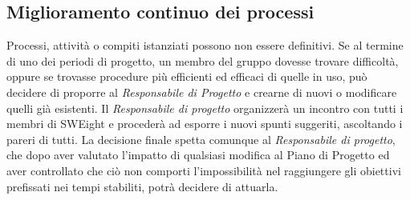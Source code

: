 \subsection{Miglioramento continuo dei processi}
Processi, attività o compiti istanziati possono non essere definitivi. 
Se al termine di uno dei periodi di progetto, un membro del gruppo dovesse trovare difficoltà,
 oppure se trovasse procedure più efficienti ed efficaci di quelle in uso, può decidere di proporre al \textit{Responsabile di Progetto} 
 e crearne di nuovi o modificare quelli già esistenti.  
\newline
Il \textit{Responsabile di progetto} organizzerà un incontro con tutti i membri di SWEight e procederà ad esporre i nuovi spunti suggeriti, ascoltando i pareri di tutti. 
\newline
La decisione finale spetta comunque al \textit{Responsabile di progetto}, che dopo aver valutato l'impatto di qualsiasi modifica al Piano di Progetto ed aver controllato che ciò non comporti l'impossibilità nel raggiungere gli obiettivi prefissati nei tempi stabiliti, potrà decidere di attuarla.

